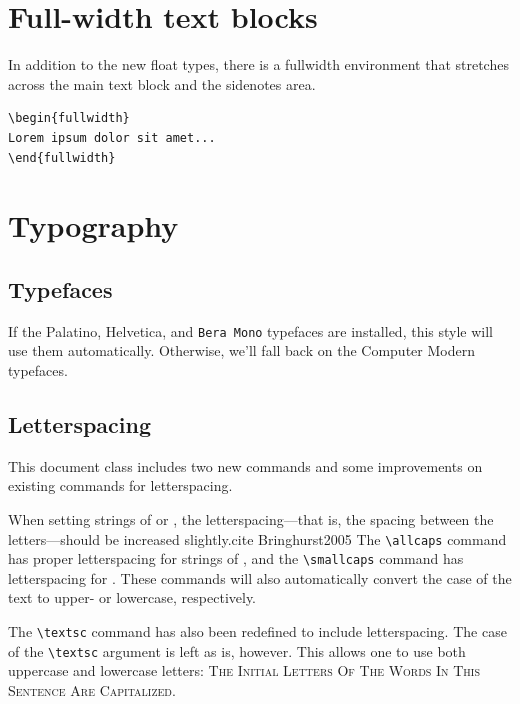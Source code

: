 \documentclass{tufte-handout}
\newcommand{\docenv}[1]{\textsf{#1}}%
\begin{document}
\section{Full-width text blocks}

In addition to the new float types, there is a \docenv{fullwidth}
environment that stretches across the main text block and the sidenotes
area.

\begin{Verbatim}
\begin{fullwidth}
Lorem ipsum dolor sit amet...
\end{fullwidth}
\end{Verbatim}

\begin{fullwidth}
\small\itshape\lipsum[1]
\end{fullwidth}

\section{Typography}\label{sec:typography}

\subsection{Typefaces}\label{sec:typefaces}
If the Palatino, \textsf{Helvetica}, and \texttt{Bera Mono} typefaces are installed, this style
will use them automatically.  Otherwise, we'll fall back on the Computer Modern
typefaces.

\subsection{Letterspacing}\label{sec:letterspacing}
This document class includes two new commands and some improvements on
existing commands for letterspacing.

When setting strings of  or , the
letter\-spacing---that is, the spacing between the letters---should be
increased slightly.cite Bringhurst2005  The \Verb|\allcaps| command has proper letterspacing for
strings of , and the \Verb|\smallcaps| command
has letterspacing for .  These commands
will also automatically convert the case of the text to upper- or
lowercase, respectively.

The \Verb|\textsc| command has also been redefined to include
letterspacing.  The case of the \Verb|\textsc| argument is left as is,
however.  This allows one to use both uppercase and lowercase letters:
\textsc{The Initial Letters Of The Words In This Sentence Are Capitalized.}
\end{document}

